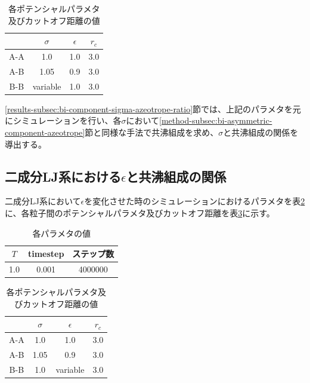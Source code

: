 \documentclass[titlepage]{jsreport}
\begin{document}
\begin{table}[htbp]
    \begin{center}
        \caption{各ポテンシャルパラメタ及びカットオフ距離の値}
        \label{table:bi-component-sigma-azeotrope-ratio-potential-parameter}
        \begin{tabular}{c c c c}
            & $\sigma$ & $\epsilon$ & $r_c$ \\
            \hline
            A-A & 1.0 & 1.0 & 3.0 \\
            A-B & 1.05 & 0.9 & 3.0 \\
            B-B & variable & 1.0 & 3.0
        \end{tabular}
    \end{center}
\end{table}

\ref{results-subsec:bi-component-sigma-azeotrope-ratio}節では、上記のパラメタを元にシミュレーションを行い、各$\sigma$において\ref{method-subsec:bi-asymmetric-component-azeotrope}節と同様な手法で共沸組成を求め、$\sigma$と共沸組成の関係を導出する。


\subsection{二成分LJ系における$\epsilon$と共沸組成の関係} \label{method-subsec:bi-component-epsilon-azeotrope-ratio}
二成分LJ系において${\epsilon}$を変化させた時のシミュレーションにおけるパラメタを表\ref{table:bi-component-epsilon-azeotrope-ratio-parameter}に、各粒子間のポテンシャルパラメタ及びカットオフ距離を表\ref{table:bi-component-epsilon-azeotrope-ratio-potential-parameter}に示す。

\begin{table}[htbp]
    \begin{center}
        \caption{各パラメタの値}
        \label{table:bi-component-epsilon-azeotrope-ratio-parameter}
        \begin{tabular}{c c c}
            $T$ & timestep & ステップ数 \\
            \hline
            1.0 & 0.001 & 4000000 \\
        \end{tabular}
    \end{center}
\end{table}

\begin{table}[htbp]
    \begin{center}
        \caption{各ポテンシャルパラメタ及びカットオフ距離の値}
        \label{table:bi-component-epsilon-azeotrope-ratio-potential-parameter}
        \begin{tabular}{c c c c}
            & $\sigma$ & $\epsilon$ & $r_c$ \\
            \hline
            A-A & 1.0 & 1.0 & 3.0 \\
            A-B & 1.05 & 0.9 & 3.0 \\
            B-B & 1.0 & variable & 3.0
        \end{tabular}
    \end{center}
\end{table}
\end{document}
